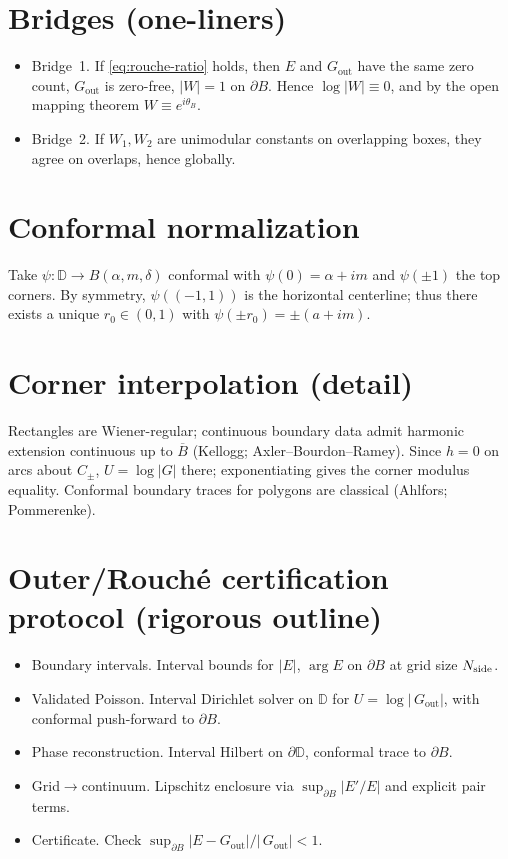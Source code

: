 \documentclass[11pt]{article}
\numberwithin{equation}{section}
\theoremstyle{remark}
\newcommand{\D}{\mathbb{D}}
\newcommand{\Gout}{G_{\mathrm{out}}}
\begin{document}
\section{Bridges (one-liners)}
\begin{itemize}
\item Bridge~1. If \eqref{eq:rouche-ratio} holds, then $E$ and $\Gout$ have the same zero count, $\Gout$ is zero-free, $|W|=1$ on $\partial B$. Hence $\log|W|\equiv 0$, and by the open mapping theorem $W\equiv e^{i\theta_B}$.
\item Bridge~2. If $W_1,W_2$ are unimodular constants on overlapping boxes, they agree on overlaps, hence globally.
\end{itemize}

\section{Conformal normalization}
Take $\psi:\D\to B(\alpha,m,\delta)$ conformal with $\psi(0)=\alpha+i m$ and $\psi(\pm 1)$ the top corners. By symmetry, $\psi((-1,1))$ is the horizontal centerline; thus there exists a unique $r_0\in(0,1)$ with $\psi(\pm r_0)=\pm(a+im)$.

\section{Corner interpolation (detail)}
Rectangles are Wiener-regular; continuous boundary data admit harmonic extension continuous up to $\overline B$ (Kellogg; Axler--Bourdon--Ramey). Since $h=0$ on arcs about $C_\pm$, $U=\log|G|$ there; exponentiating gives the corner modulus equality. Conformal boundary traces for polygons are classical (Ahlfors; Pommerenke).

\section{Outer/Rouch\'e certification protocol (rigorous outline)}\label{app:cert}
\begin{itemize}
\item Boundary intervals. Interval bounds for $|E|$, $\arg E$ on $\partial B$ at grid size $N_{\rm side}$.
\item Validated Poisson. Interval Dirichlet solver on $\D$ for $U=\log|\,\Gout|$, with conformal push-forward to $\partial B$.
\item Phase reconstruction. Interval Hilbert on $\partial\D$, conformal trace to $\partial B$.
\item Grid$\to$continuum. Lipschitz enclosure via $\sup_{\partial B}|E'/E|$ and explicit pair terms.
\item Certificate. Check $\sup_{\partial B}|E-\Gout|/|\,\Gout|<1$.
\end{itemize}
\end{document}

